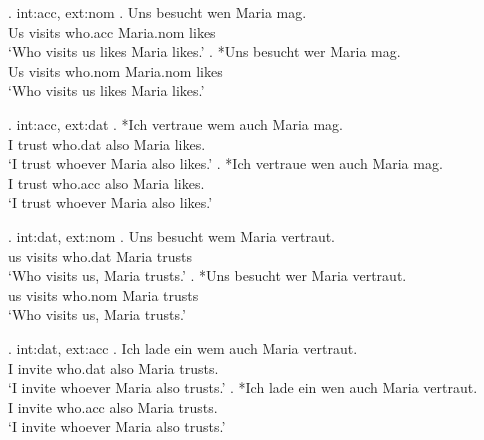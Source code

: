 \ex. \ac{int}:\ac{acc}, \ac{ext}:\ac{nom}
\ag. Uns besucht wen Maria mag.\\
 Us visits\scsub{[nom]} who.\ac{acc} Maria.\ac{nom} likes\scsub{[acc]}\\
 `Who visits us likes Maria likes.' 
\bg. *Uns besucht wer Maria mag.\\
 Us visits\scsub{[nom]} who.\ac{nom} Maria.\ac{nom} likes\scsub{[acc]}\\
 `Who visits us likes Maria likes.' 

 \ex. \ac{int}:\ac{acc}, \ac{ext}:\ac{dat}
\ag. *Ich vertraue wem auch Maria mag. \\
 I trust\scsub{[dat]} who.\ac{dat} also Maria likes\scsub{[acc]}.\\
 `I trust whoever Maria also likes.' 
\bg. *Ich vertraue wen auch Maria mag. \\
 I trust\scsub{[dat]} who.\ac{acc} also Maria likes\scsub{[acc]}.\\
 `I trust whoever Maria also likes.' 

\ex. \ac{int}:\ac{dat}, \ac{ext}:\ac{nom}
\ag. Uns besucht wem Maria vertraut.\\
 us visits\scsub{[nom]} who.\ac{dat} Maria trusts\scsub{[dat]}\\
 `Who visits us, Maria trusts.' 
\bg. *Uns besucht wer Maria vertraut.\\
 us visits\scsub{[nom]} who.\ac{nom} Maria trusts\scsub{[dat]}\\
 `Who visits us, Maria trusts.' 

\ex. \ac{int}:\ac{dat}, \ac{ext}:\ac{acc}
\ag. Ich {lade ein} wem auch Maria vertraut. \\
 I invite\scsub{[acc]} who.\ac{dat} also Maria trusts\scsub{[dat]}.\\
 `I invite whoever Maria also trusts.' 
\bg. *Ich {lade ein} wen auch Maria vertraut. \\
 I invite\scsub{[acc]} who.\ac{acc} also Maria trusts\scsub{[dat]}.\\
 `I invite whoever Maria also trusts.' 


